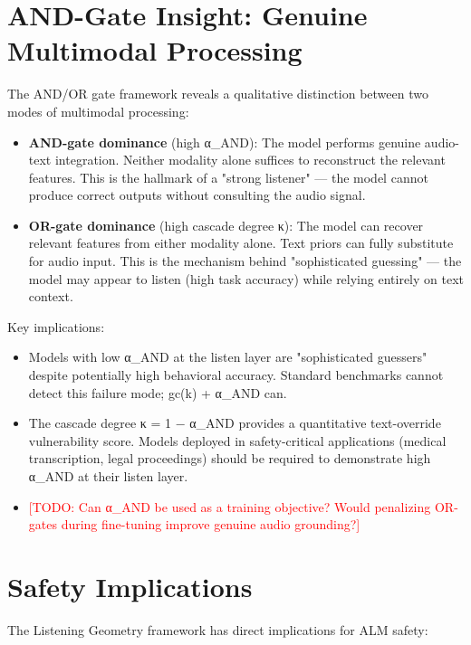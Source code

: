 \documentclass[a4paper]{article}
\begin{document}
{{\section{AND-Gate Insight: Genuine Multimodal Processing}

The AND/OR gate framework reveals a qualitative distinction between two modes of multimodal processing:

\begin{itemize}
\item \textbf{AND-gate dominance} (high α_AND): The model performs genuine audio-text integration. Neither modality alone suffices to reconstruct the relevant features. This is the hallmark of a "strong listener" — the model cannot produce correct outputs without consulting the audio signal.
\end{itemize}

\begin{itemize}
\item \textbf{OR-gate dominance} (high cascade degree κ): The model can recover relevant features from either modality alone. Text priors can fully substitute for audio input. This is the mechanism behind "sophisticated guessing" — the model may appear to listen (high task accuracy) while relying entirely on text context.
\end{itemize}

Key implications:

\begin{itemize}
\item Models with low α_AND at the listen layer are "sophisticated guessers" despite potentially high behavioral accuracy. Standard benchmarks cannot detect this failure mode; gc(k) + α_AND can.
\item The cascade degree κ = 1 − α_AND provides a quantitative text-override vulnerability score. Models deployed in safety-critical applications (medical transcription, legal proceedings) should be required to demonstrate high α_AND at their listen layer.
\item \textcolor{red}{[TODO: Can α_AND be used as a training objective? Would penalizing OR-gates during fine-tuning improve genuine audio grounding?]}
\end{itemize}


\section{Safety Implications}

The Listening Geometry framework has direct implications for ALM safety:

}}
\end{document}
